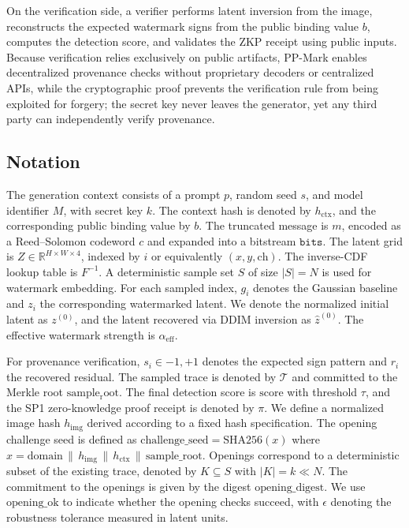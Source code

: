 \documentclass{article}
\theoremstyle{plain}
\theoremstyle{definition}
\theoremstyle{remark}
\begin{document}
On the verification side, a verifier performs latent inversion from the image, reconstructs the expected watermark signs from the public binding value \(b\), computes the detection score, and validates the ZKP receipt using public inputs. Because verification relies exclusively on public artifacts, PP-Mark enables decentralized provenance checks without proprietary decoders or centralized APIs, while the cryptographic proof prevents the verification rule from being exploited for forgery; the secret key never leaves the generator, yet any third party can independently verify provenance.

\subsection{Notation}
The generation context consists of a prompt $p$, random seed $s$, and model identifier $M$, with secret key $k$. The context hash is denoted by $h_{\mathrm{ctx}}$, and the corresponding public binding value by $b$. The truncated message is $m$, encoded as a Reed–Solomon codeword $c$ and expanded into a bitstream $\mathtt{bits}$. The latent grid is $Z \in \mathbb{R}^{H \times W \times 4}$, indexed by $i$ or equivalently $(x,y,\mathrm{ch})$. The inverse-CDF lookup table is $F^{-1}$. A deterministic sample set $S$ of size $|S|=N$ is used for watermark embedding. For each sampled index, $g_i$ denotes the Gaussian baseline and $z_i$ the corresponding watermarked latent. We denote the normalized initial latent as $z^{(0)}$, and the latent recovered via DDIM inversion as $\hat{z}^{(0)}$. The effective watermark strength is $\alpha_{\mathrm{eff}}$.

For provenance verification, $s_i \in {-1,+1}$ denotes the expected sign pattern and $r_i$ the recovered residual. The sampled trace is denoted by $\mathcal{T}$ and committed to the Merkle root $\mathrm{sample_root}$. The final detection score is $\mathrm{score}$ with threshold $\tau$, and the SP1 zero-knowledge proof receipt is denoted by $\pi$. We define a normalized image hash $h_{\mathrm{img}}$ derived according to a fixed hash specification. The opening challenge seed is defined as
$\mathrm{challenge\_seed} = \mathrm{SHA256}(x)$ where $x = \mathrm{domain} \,\|\, h_{\mathrm{img}} \,\|\, h_{\mathrm{ctx}} \,\|\, \mathrm{sample\_root}$. Openings correspond to a deterministic subset of the existing trace, denoted by $K \subseteq S$ with $|K| = k \ll N$. The commitment to the openings is given by the digest $\mathrm{opening\_digest}$. We use $\mathrm{opening\_ok}$ to indicate whether the opening checks succeed, with $\epsilon$ denoting the robustness tolerance measured in latent units.
\end{document}
